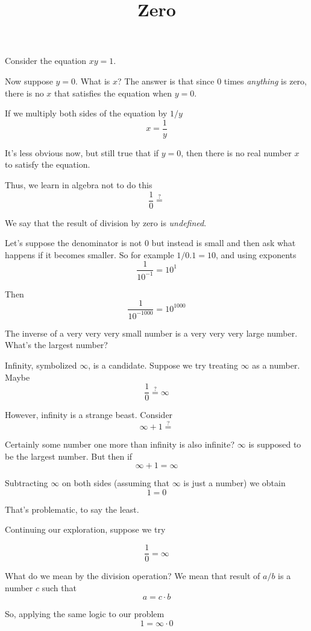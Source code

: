 \documentclass[11pt, oneside]{article}
\title{Zero}
\date{}
\begin{document}
\maketitle
\Large


Consider the equation $xy = 1$.  

Now suppose $y = 0$.  What is $x$?  The answer is that since $0$ times \emph{anything} is zero, there is no $x$ that satisfies the equation when $y = 0$.  

If we multiply both sides of the equation by $1/y$ 
\[ x = \frac{1}{y} \]

It's less obvious now, but still true that if $y = 0$, then there is no real number $x$ to satisfy the equation.

Thus, we learn in algebra not to do this
\[ \frac{1}{0} \stackrel{?}{=} \]

We say that the result of division by zero is \emph{undefined}. 

Let's suppose the denominator is not $0$ but instead is small and then ask what happens if it becomes smaller.  So for example $1/0.1 = 10$, and using exponents
\[ \frac{1}{10^{-1}} = 10^{1} \]

Then
\[ \frac{1}{10^{-1000}} = 10^{1000} \]

The inverse of a very very very small number is a very very very large number.  What's the largest number?  

Infinity, symbolized $\infty$, is a candidate.  Suppose we try treating $\infty$ as a number.  Maybe
\[ \frac{1}{0} \stackrel{?}{=} \infty \]

However, infinity is a strange beast.  Consider
\[ \infty + 1 \stackrel{?}{=} \]

Certainly some number one more than infinity is also infinite?  $\infty$ is supposed to be the largest number.  But then if
\[  \infty + 1 = \infty \]

Subtracting $\infty$ on both sides (assuming that $\infty$ is just a number) we obtain
\[ 1 = 0 \]

That's problematic, to say the least.  

Continuing our exploration, suppose we try

\[ \frac{1}{0} = \infty \]

What do we mean by the division operation?  We mean that result of $a/b$ is a number $c$ such that
\[ a = c \cdot b \]

So, applying the same logic to our problem
\[ 1 = \infty \cdot 0 \]
\end{document}
